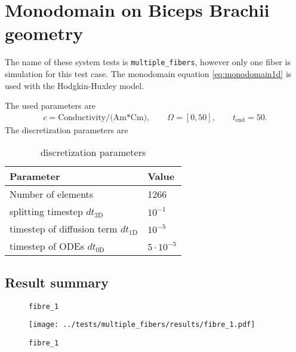 %
\clearpage
%
\section{Monodomain on Biceps Brachii geometry}
  The name of these system tests is \lstinline{multiple_fibers}, however only one fiber is simulation for this test case.
  The monodomain equation \eqref{eq:monodomain1d} is used with the Hodgkin-Huxley model.
  
  The used parameters are
  \begin{equation*}
    \begin{array}{lll}
      c = \text{Conductivity/(Am*Cm)},\qquad \Omega = [0,50], \qquad t_\text{end}=50.
    \end{array}
  \end{equation*}
  The discretization parameters are
  \begin{table}[h!]
    \begin{center}
      \begin{tabular}{l|l}
        \textbf{Parameter} & \textbf{Value}\\
        \hline
        Number of elements & 1266\\
        splitting timestep $dt_\text{3D}$ & $10^{-1}$\\
        timestep of diffusion term $dt_\text{1D}$ & $10^{-5}$\\
        timestep of ODEs $dt_\text{0D}$ & $5\cdot 10^{-5}$
      \end{tabular}
    \end{center}
    \caption{discretization parameters}
    \label{tab:table_monodomain2}
  \end{table}

\subsection{Result summary}
%
\begin{figure}[h!]
  \caption{\lstinline{fibre_1}}
\end{figure} 
%
\begin{figure}[t]%
  \centering%
  \texttt{[image: ../tests/multiple\_fibers/results/fibre\_1.pdf]}%
  \caption{\lstinline{fibre_1}}
\end{figure}%
%


%
